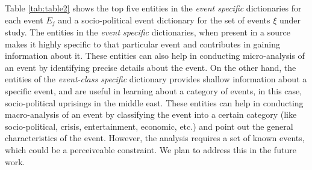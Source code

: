 Table \ref{tab:table2} shows the top five entities in the \textit{event specific} dictionaries for each event $E_{j}$ and a socio-political event dictionary for the set of events $\xi$ under study. The entities in the \textit{event specific} dictionaries, when present in a source makes it highly specific to that particular event and contributes in gaining information about it. These entities can also help in conducting micro-analysis of an event by identifying precise details about the event. On the other hand, the entities of the \textit{event-class specific} dictionary provides shallow information about a specific event, and are useful in learning about a category of events, in this case, socio-political uprisings in the middle east. These entities can help in conducting macro-analysis of an event by classifying the event into a certain category (like socio-political, crisis, entertainment, economic, etc.) and point out the general characteristics of the event. However, the analysis requires a set of known events, which could be a perceiveable constraint. We plan to address this in the future work. 









